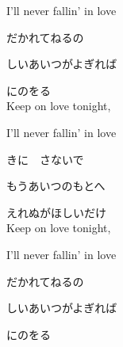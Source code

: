 {I'll never fallin' in love

だかれてねるの

しいあいつがよぎれば

にのをる
\\

Keep on love tonight,

I'll never fallin' in love

きに　さないで

もうあいつのもとへ

えれぬがほしいだけ
\\

Keep on love tonight,

I'll never fallin' in love

だかれてねるの

しいあいつがよぎれば

にのをる

}